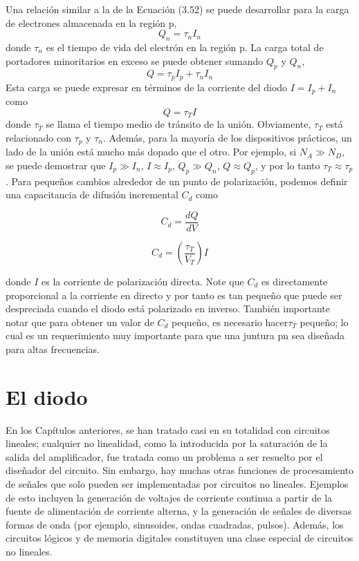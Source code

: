 Una relación similar a la de la Ecuación (3.52) se puede desarrollar para la carga de electrones almacenada en la región p,
\[ Q_n = \tau_n I_n \]
donde \( \tau_n \) es el tiempo de vida del electrón en la región p. La carga total de portadores minoritarios en exceso se puede obtener sumando \( Q_p \) y \( Q_n \),
\[ Q = \tau_p I_p + \tau_n I_n \]
Esta carga se puede expresar en términos de la corriente del diodo \( I = I_p + I_n \) como
\[ Q = \tau_T I \]
donde \( \tau_T \) se llama el tiempo medio de tránsito de la unión. Obviamente, \( \tau_T \) está relacionado con \( \tau_p \) y \( \tau_n \). Además, para la mayoría de los dispositivos prácticos, un lado de la unión está mucho más dopado que el otro. Por ejemplo, si \( N_A \gg N_D \), se puede demostrar que \( I_p \gg I_n \), \( I \approx I_p \), \( Q_p \gg Q_n \), \( Q \approx Q_p \), y por lo tanto \( \tau_T \approx \tau_p \).
Para pequeños cambios alrededor de un punto de polarización, podemos definir una capacitancia de difusión incremental \( C_d \) como

\begin{equation*}
C_d = \frac{d Q}{d V}
\end{equation*}

\begin{equation*}
C_d = \left( \frac{\tau_T}{V_T} \right) I
\end{equation*}

donde $I$ es la corriente de polarización directa. Note que $C_d$ es directamente proporcional a la corriente en directo y por tanto es tan pequeño que puede ser despreciada cuando el diodo está polarizado en inverso. También importante notar que para obtener un valor de $C_d$ pequeño, es necesario hacer$\tau_T$ pequeño; lo cual es un requerimiento muy importante para que una juntura pn sea diseñada para altas frecuencias.

\section{El diodo} \label{SeccionDiodo}

En los Capítulos anteriores, se han tratado casi en su totalidad con circuitos lineales; cualquier no linealidad, como la introducida por la saturación de la salida del amplificador, fue tratada como un problema a ser resuelto por el diseñador del circuito. Sin embargo, hay muchas otras funciones de procesamiento de señales que solo pueden ser implementadas por circuitos no lineales. Ejemplos de esto incluyen la generación de voltajes de corriente continua a partir de la fuente de alimentación de corriente alterna, y la generación de señales de diversas formas de onda (por ejemplo, sinusoides, ondas cuadradas, pulsos). Además, los circuitos lógicos y de memoria digitales constituyen una clase especial de circuitos no lineales.


